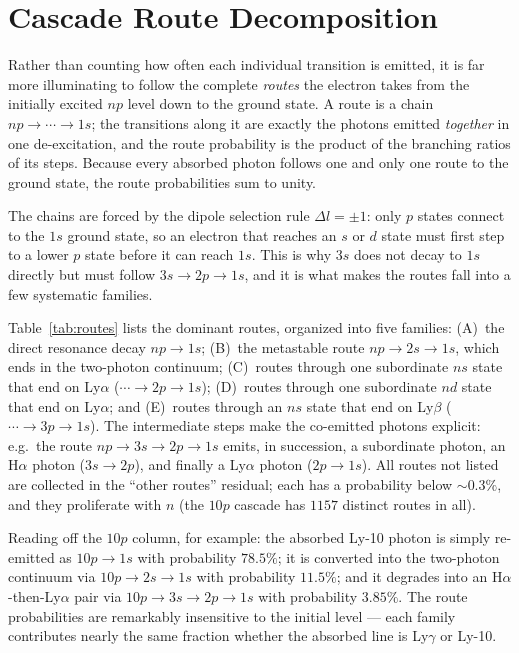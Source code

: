 \documentclass[english,a4paper]{my_memo}
\begin{document}
\section{Cascade Route Decomposition}
\label{sec:routes}

Rather than counting how often each individual transition is emitted, it is
far more illuminating to follow the complete \emph{routes} the electron takes
from the initially excited $np$ level down to the ground state.  A route is a
chain $np \to \cdots \to 1s$; the transitions along it are exactly the photons
emitted \emph{together} in one de-excitation, and the route probability is the
product of the branching ratios of its steps.  Because every absorbed photon
follows one and only one route to the ground state, the route probabilities
sum to unity.

The chains are forced by the dipole selection rule $\Delta l = \pm 1$: only
$p$ states connect to the $1s$ ground state, so an electron that reaches an
$s$ or $d$ state must first step to a lower $p$ state before it can reach
$1s$.  This is why $3s$ does not decay to $1s$ directly but must follow
$3s \to 2p \to 1s$, and it is what makes the routes fall into a few
systematic families.

Table~\ref{tab:routes} lists the dominant routes, organized into five
families:
(A)~the direct resonance decay $np \to 1s$;
(B)~the metastable route $np \to 2s \to 1s$, which ends in the two-photon
continuum;
(C)~routes through one subordinate $ns$ state that end on Ly$\alpha$
($\cdots \to 2p \to 1s$);
(D)~routes through one subordinate $nd$ state that end on Ly$\alpha$; and
(E)~routes through an $ns$ state that end on Ly$\beta$
($\cdots \to 3p \to 1s$).
The intermediate steps make the co-emitted photons explicit: e.g.\ the route
$np \to 3s \to 2p \to 1s$ emits, in succession, a subordinate photon, an
H$\alpha$ photon ($3s \to 2p$), and finally a Ly$\alpha$ photon
($2p \to 1s$).  All routes not listed are collected in the ``other routes''
residual; each has a probability below $\sim 0.3\%$, and they proliferate with
$n$ (the $10p$ cascade has $1157$ distinct routes in all).

Reading off the $10p$ column, for example: the absorbed Ly-10 photon is simply
re-emitted as $10p \to 1s$ with probability $78.5\%$; it is converted into the
two-photon continuum via $10p \to 2s \to 1s$ with probability $11.5\%$; and it
degrades into an H$\alpha$-then-Ly$\alpha$ pair via $10p \to 3s \to 2p \to 1s$
with probability $3.85\%$.  The route probabilities are remarkably insensitive
to the initial level --- each family contributes nearly the same fraction
whether the absorbed line is Ly$\gamma$ or Ly-10.
\end{document}
